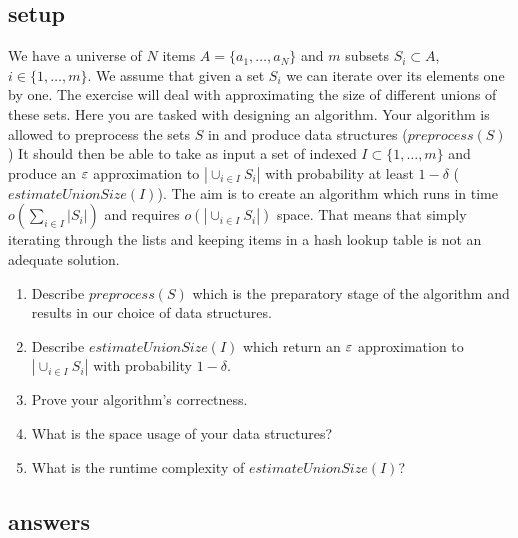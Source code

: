 \documentclass{article}
\begin{document}
\subsection*{setup}
We have a universe of $N$ items $A = \{a_1,\ldots, a_N\}$
and $m$ subsets $S_i \subset A$, $i \in \{1,\ldots,m\}$.
We assume that given a set $S_i$ we can iterate over its elements one by one.
The exercise will deal with approximating the size of different unions of these sets.  
Here you are tasked with designing an algorithm. 
Your algorithm is allowed to preprocess the sets $S$ in and produce data structures ($preprocess(S)$)
It should then be able to take as input a set of indexed $I \subset \{1,\ldots,m\}$ and produce
an $\varepsilon$ approximation to $|\cup_{i \in I}S_i|$ with probability at least $1-\delta$ ($estimateUnionSize(I)$).
The aim is to create an algorithm which runs in time $o(\sum_{i \in I}|S_i|)$ and requires $o(|\cup_{i \in I}S_i|)$ space. 
That means that simply iterating through the lists and keeping items in a hash lookup table is not an adequate solution. 

\begin{enumerate}
\item Describe $preprocess(S)$ which is the preparatory stage of the algorithm and results in our choice of data structures.
\item Describe $estimateUnionSize(I)$ which return an $\varepsilon$ approximation to $|\cup_{i \in I}S_i|$ with probability $1-\delta$.
\item Prove your algorithm's correctness.
\item What is the space usage of your data structures?
\item What is the runtime complexity of $estimateUnionSize(I)$?
\end{enumerate}


\pagebreak


\subsection*{answers}
\end{document}
